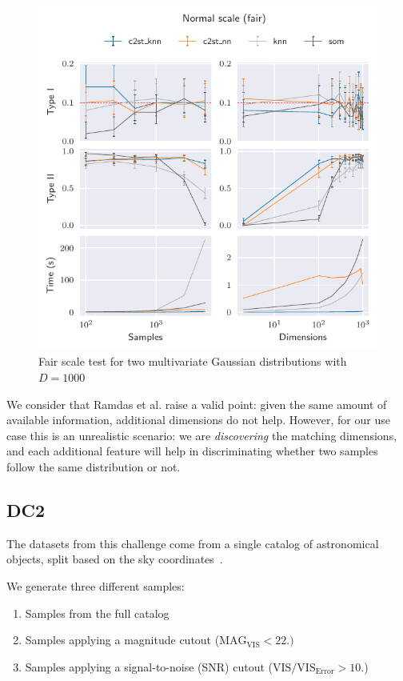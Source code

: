 \begin{figure}[htbp]
    \centering
    \includegraphics{images/6_som/normal_scale_fair}
    \caption{Fair scale test for two multivariate Gaussian distributions with $D=1000$}
    \label{fig:normal_fair_scale}
\end{figure}

We consider that Ramdas et al. raise a valid point: given the same amount of available
information, additional dimensions do not help. However, for our \PresQ use case this is an
unrealistic scenario: we are \emph{discovering} the matching dimensions, and each additional
feature will help in discriminating whether two samples follow the same distribution or not.

\subsection{DC2}
The datasets from this challenge come from a single catalog of astronomical
objects, split based on the sky coordinates~\cite{EuclidDesprez2020}.

We generate three different samples:

\begin{enumerate}
    \item Samples from the full catalog
    \item Samples applying a magnitude cutout ($\text{MAG}_\text{VIS} < 22.)$
    \item Samples applying a signal-to-noise (SNR) cutout ($\text{VIS} / \text{VIS}_\text{Error} > 10.$)
\end{enumerate}

